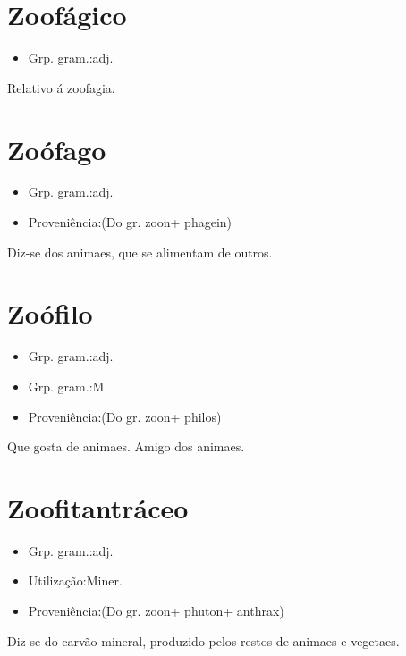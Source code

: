 \section{Zoofágico}
\begin{itemize}
\item {Grp. gram.:adj.}
\end{itemize}
Relativo á zoofagia.
\section{Zoófago}
\begin{itemize}
\item {Grp. gram.:adj.}
\end{itemize}
\begin{itemize}
\item {Proveniência:(Do gr. \textunderscore zoon\textunderscore  + \textunderscore phagein\textunderscore )}
\end{itemize}
Diz-se dos animaes, que se alimentam de outros.
\section{Zoófilo}
\begin{itemize}
\item {Grp. gram.:adj.}
\end{itemize}
\begin{itemize}
\item {Grp. gram.:M.}
\end{itemize}
\begin{itemize}
\item {Proveniência:(Do gr. \textunderscore zoon\textunderscore  + \textunderscore philos\textunderscore )}
\end{itemize}
Que gosta de animaes.
Amigo dos animaes.
\section{Zoofitantráceo}
\begin{itemize}
\item {Grp. gram.:adj.}
\end{itemize}
\begin{itemize}
\item {Utilização:Miner.}
\end{itemize}
\begin{itemize}
\item {Proveniência:(Do gr. \textunderscore zoon\textunderscore  + \textunderscore phuton\textunderscore  + \textunderscore anthrax\textunderscore )}
\end{itemize}
Diz-se do carvão mineral, produzido pelos restos de animaes e vegetaes.
